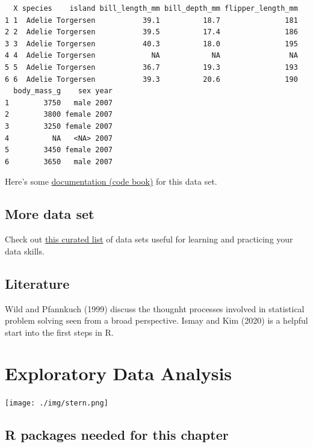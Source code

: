 \documentclass[
  letterpaper,
  DIV=11,
  numbers=noendperiod]{scrreprt}
\theoremstyle{definition}
\theoremstyle{definition}
\theoremstyle{remark}
\begin{document}
\begin{verbatim}
  X species    island bill_length_mm bill_depth_mm flipper_length_mm
1 1  Adelie Torgersen           39.1          18.7               181
2 2  Adelie Torgersen           39.5          17.4               186
3 3  Adelie Torgersen           40.3          18.0               195
4 4  Adelie Torgersen             NA            NA                NA
5 5  Adelie Torgersen           36.7          19.3               193
6 6  Adelie Torgersen           39.3          20.6               190
  body_mass_g    sex year
1        3750   male 2007
2        3800 female 2007
3        3250 female 2007
4          NA   <NA> 2007
5        3450 female 2007
6        3650   male 2007
\end{verbatim}

Here's some
\href{https://vincentarelbundock.github.io/Rdatasets/doc/palmerpenguins/penguins.html}{documentation
(code book)} for this data set.

\hypertarget{more-data-set}{%
\section{More data set}\label{more-data-set}}

Check out
\href{https://data-se.netlify.app/2022/02/23/data-sets-for-for-teaching/}{this
curated list} of data sets useful for learning and practicing your data
skills.

\hypertarget{literature}{%
\section{Literature}\label{literature}}

Wild and Pfannkuch (1999) discuss the thougnht processes involved in
statistical problem solving seen from a broad perspective. Ismay and Kim
(2020) is a helpful start into the first steps in R.


\hypertarget{exploratory-data-analysis}{%
\chapter{Exploratory Data Analysis}\label{exploratory-data-analysis}}

\texttt{[image: ./img/stern.png]}

\hypertarget{r-packages-needed-for-this-chapter}{%
\section{R packages needed for this
chapter}\label{r-packages-needed-for-this-chapter}}
\end{document}
